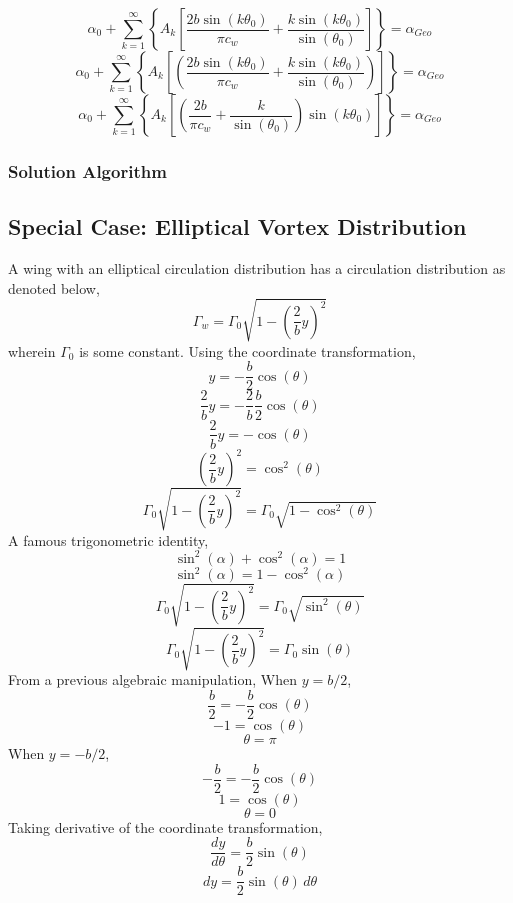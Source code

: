 \documentclass[a4paper, 12pt]{report}
\begin{document}
\begin{center}
$$\alpha_{0} + \sum^{\infty}_{k = 1}\left\{A_{k}\left[\frac{2b\sin(k\theta_{0})}{\pi c_{w}} + \frac{k\sin(k\theta_{0})}{\sin(\theta_{0})}\right]\right\} = \alpha_{Geo}$$
$$\alpha_{0} + \sum^{\infty}_{k = 1}\left\{A_{k}\left[\left(\frac{2b\sin(k\theta_{0})}{\pi c_{w}} + \frac{k\sin(k\theta_{0})}{\sin(\theta_{0})}\right)\right]\right\} = \alpha_{Geo}$$
\begin{equation}
\alpha_{0} + \sum^{\infty}_{k = 1}\left\{A_{k}\left[\left(\frac{2b}{\pi c_{w}} + \frac{k}{\sin(\theta_{0})}\right)\sin(k\theta_{0})\right]\right\} = \alpha_{Geo}
\label{System of Equations Lifting Line Theory General}
\end{equation}


\subsubsection{Solution Algorithm}
\begin{comment}
\end{comment}


\subsection{Special Case: Elliptical Vortex Distribution}
\begin{comment}
\end{comment}
A wing with an elliptical circulation distribution has a circulation distribution as denoted below,
$$\Gamma_{w} = \Gamma_{0}\sqrt{1-\left(\frac{2}{b}y\right)^{2}}$$
wherein $\Gamma_{0}$ is some constant. Using the coordinate transformation, 
$$y = -\frac{b}{2}\cos(\theta)$$
$$\frac{2}{b}y = -\frac{2}{b}\frac{b}{2}\cos(\theta)$$
$$\frac{2}{b}y = -\cos(\theta)$$
$$\left(\frac{2}{b}y\right)^{2} = \cos^{2}(\theta)$$
$$\Gamma_{0}\sqrt{1-\left(\frac{2}{b}y\right)^{2}} = \Gamma_{0}\sqrt{1-\cos^{2}(\theta)}$$
A famous trigonometric identity,
$$\sin^{2}(\alpha) + \cos^{2}(\alpha) = 1$$
$$\sin^{2}(\alpha) = 1 - \cos^{2}(\alpha)$$
$$\Gamma_{0}\sqrt{1-\left(\frac{2}{b}y\right)^{2}} = \Gamma_{0}\sqrt{\sin^{2}(\theta)}$$
\begin{equation}
\Gamma_{0}\sqrt{1-\left(\frac{2}{b}y\right)^{2}} = \Gamma_{0}\sin(\theta)
\label{elliptical circulation distribution th coordinates}
\end{equation}
From a previous algebraic manipulation, When $y = b/2$,
$$\frac{b}{2} = -\frac{b}{2}\cos(\theta)$$
$$-1 = \cos(\theta)$$
$$\theta = \pi$$
When $y = -b/2$,
$$-\frac{b}{2} = -\frac{b}{2}\cos(\theta)$$
$$1 = \cos(\theta)$$
$$\theta = 0$$
Taking derivative of the coordinate transformation,
$$\frac{dy}{d\theta} = \frac{b}{2}\sin(\theta)$$
\begin{equation}
dy = \frac{b}{2}\sin(\theta)\,d\theta
\label{dy in terms of th lifting line coordinates}
\end{equation}



\end{center}
\end{document}
